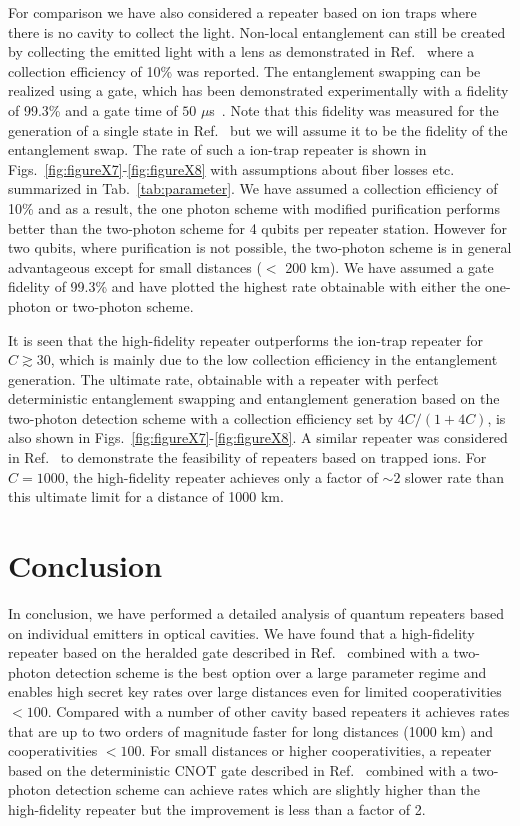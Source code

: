 For comparison we have also considered a repeater based on ion traps where there
is no cavity to collect the light. Non-local entanglement can still be created
by collecting the emitted light with a lens as demonstrated in
Ref.~\cite{monroe2014} where a collection efficiency of 10\% was reported. The
entanglement swapping can be realized using a gate, which has been demonstrated
experimentally with a fidelity of 99.3\% and a gate time of $50$
$\mu$s~\cite{blatt1}. Note that this fidelity was measured for the generation of
a single state in Ref.~\cite{blatt1} but we will assume it to be the fidelity of
the entanglement swap. The rate of such a ion-trap repeater is shown in
Figs.~\ref{fig:figureX7}-\ref{fig:figureX8} with assumptions about fiber losses
etc. summarized in Tab.~\ref{tab:parameter}. We have assumed a collection
efficiency of 10\% and as a result, the one photon scheme with modified
purification performs better than the two-photon scheme for 4 qubits per
repeater station. However for two qubits, where purification is not possible,
the two-photon scheme is in general advantageous except for small distances ($<$
200 km). We have assumed a gate fidelity of 99.3\% and have plotted the highest
rate obtainable with either the one-photon or two-photon scheme.

It is seen that the high-fidelity repeater outperforms the ion-trap repeater for
$C\gtrsim30$, which is mainly due to the low collection efficiency in the
entanglement generation. The ultimate rate, obtainable with a repeater with
perfect deterministic entanglement swapping and entanglement generation based on
the two-photon detection scheme with a collection efficiency set by $4C/(1+4C)$,
is also shown in Figs.~\ref{fig:figureX7}-\ref{fig:figureX8}. A similar repeater was
considered in Ref.~\cite{sangouard2} to demonstrate the feasibility of repeaters
based on trapped ions. For $C=1000$, the high-fidelity repeater achieves only a
factor of $\sim2$ slower rate than this ultimate limit for a distance of 1000
km.

\section{Conclusion}        

In conclusion, we have performed a detailed analysis of quantum repeaters based
on individual emitters in optical cavities. We have found that a high-fidelity
repeater based on the heralded gate described in Ref.~\cite{Borregaard2015a} combined
with a two-photon detection scheme is the best option over a large parameter
regime and enables high secret key rates over large distances even for limited
cooperativities $<100$. Compared with a number of other cavity based repeaters
it achieves rates that are up to two orders of magnitude faster for long
distances (1000 km) and cooperativities $<100$. For small distances or higher
cooperativities, a repeater based on the deterministic CNOT gate described in
Ref.~\cite{Anders2prl} combined with a two-photon detection scheme can achieve
rates which are slightly higher than the high-fidelity repeater but the
improvement is less than a factor of 2.


